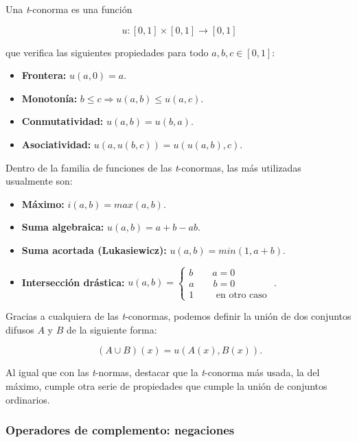 Una \textit{t}-conorma es una función

\[
\ u: [0,1] \times [0,1] \longrightarrow [0,1]
\]

que verifica las siguientes propiedades para todo $a,b,c \in [0,1]$:

\begin{itemize}
\item \textbf{Frontera:} $u(a,0) = a$.
\item \textbf{Monotonía:} $b \leq c \Rightarrow u(a,b) \leq u(a,c)$.
\item \textbf{Conmutatividad:} $u(a,b) = u(b,a)$.
\item \textbf{Asociatividad:} $u(a,u(b,c)) = u(u(a,b),c)$.
\end{itemize}

Dentro de la familia de funciones de las \textit{t}-conormas, las más utilizadas usualmente son:

\begin{itemize}
\item \textbf{Máximo:} $i(a,b)= max(a,b)$.
\item \textbf{Suma algebraica:} $u(a,b)= a+b-ab$.
\item \textbf{Suma acortada (Lukasiewicz):} $u(a,b)= min(1,a+b)$.
\item \textbf{Intersección drástica:} $u(a,b)= \left\lbrace
  \begin{array}{l}
     b \qquad a = 0 \\
     a \qquad b = 0 \\
     1 \qquad \textrm{ en otro caso }
  \end{array}
  \right.$.
\end{itemize}

Gracias a cualquiera de las \textit{t}-conormas, podemos definir la unión de dos conjuntos difusos $A$ y $B$ de la siguiente forma:

\[
\ (A \cup B)(x)= u(A(x),B(x)).
\]

Al igual que con las \textit{t}-normas, destacar que la \textit{t}-conorma más usada, la del máximo, cumple otra serie de propiedades que cumple la unión de conjuntos ordinarios.


\subsubsection{Operadores de complemento: negaciones}

